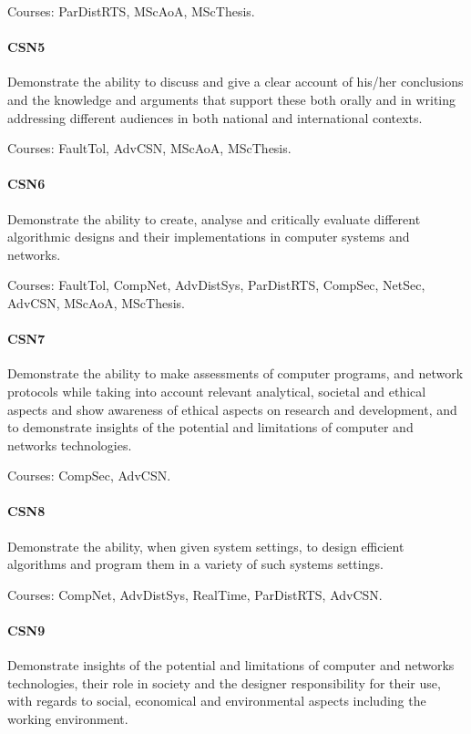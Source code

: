 Courses: ParDistRTS, MScAoA, MScThesis.

\paragraph{CSN5} Demonstrate the ability to discuss and give a clear
account of his/her conclusions and the knowledge and arguments that
support these both orally and in writing addressing different
audiences in both national and international contexts.

Courses: FaultTol, AdvCSN, MScAoA, MScThesis.

\paragraph{CSN6} Demonstrate the ability to create, analyse and
critically evaluate different algorithmic designs and their
implementations in computer systems and networks.

Courses: FaultTol, CompNet, AdvDistSys, ParDistRTS, CompSec, NetSec,
AdvCSN, MScAoA, MScThesis.

\paragraph{CSN7} Demonstrate the ability to make assessments of
computer programs, and network protocols while taking into account
relevant analytical, societal and ethical aspects and show awareness
of ethical aspects on research and development, and to demonstrate
insights of the potential and limitations of computer and networks
technologies.

Courses: CompSec, AdvCSN.

\paragraph{CSN8} Demonstrate the ability, when given system settings,
to design efficient algorithms and program them in a variety of such
systems settings.

Courses: CompNet, AdvDistSys, RealTime, ParDistRTS, AdvCSN.

\paragraph{CSN9} Demonstrate insights of the potential and limitations
of computer and networks technologies, their role in society and the
designer responsibility for their use, with regards to social,
economical and environmental aspects including the working
environment.

